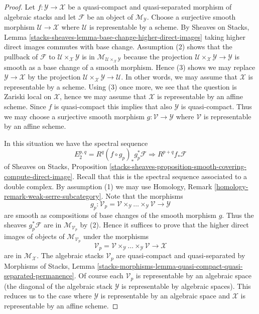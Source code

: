 \begin{proof}
Let $f : \mathcal{Y} \to \mathcal{X}$ be a quasi-compact and quasi-separated
morphism of algebraic stacks and let $\mathcal{F}$ be an object of
$\mathcal{M}_\mathcal{Y}$. Choose a surjective smooth morphism
$\mathcal{U} \to \mathcal{X}$ where $\mathcal{U}$ is representable by
a scheme. By
Sheaves on Stacks, Lemma
\ref{stacks-sheaves-lemma-base-change-higher-direct-images}
taking higher direct images commutes with base change.
Assumption (2) shows that the pullback of $\mathcal{F}$
to $\mathcal{U} \times_\mathcal{X} \mathcal{Y}$ is in
$\mathcal{M}_{\mathcal{U} \times_\mathcal{X} \mathcal{Y}}$
because the projection
$\mathcal{U} \times_\mathcal{X} \mathcal{Y} \to \mathcal{Y}$
is smooth as a base change of a smooth morphism. Hence (3) shows we may
replace $\mathcal{Y} \to \mathcal{X}$ by the projection
$\mathcal{U} \times_\mathcal{X} \mathcal{Y} \to \mathcal{U}$.
In other words, we may assume that $\mathcal{X}$
is representable by a scheme.
Using (3) once more, we see that the question is Zariski local on
$\mathcal{X}$, hence we may assume that $\mathcal{X}$ is representable by
an affine scheme. Since $f$ is quasi-compact this implies that also
$\mathcal{Y}$ is quasi-compact. Thus we may choose a surjective smooth
morphism $g : \mathcal{V} \to \mathcal{Y}$ where $\mathcal{V}$ is representable
by an affine scheme.

\medskip\noindent
In this situation we have the spectral sequence
$$
E_2^{p, q} = R^q(f \circ g_p)_*g_p^*\mathcal{F}
\Rightarrow
R^{p + q}f_*\mathcal{F}
$$
of
Sheaves on Stacks, Proposition
\ref{stacks-sheaves-proposition-smooth-covering-compute-direct-image}.
Recall that this is the spectral sequence associated to a double
complex. By assumption (1) we may use
Homology, Remark \ref{homology-remark-weak-serre-subcategory}.
Note that the morphisms
$$
g_p : \mathcal{V}_p =
\mathcal{V} \times_\mathcal{Y} \ldots \times_\mathcal{Y} \mathcal{V}
\longrightarrow
\mathcal{Y}
$$
are smooth as compositions of base changes of the smooth morphism $g$.
Thus the sheaves $g_p^*\mathcal{F}$ are in
$\mathcal{M}_{\mathcal{V}_p}$ by (2). Hence it suffices to prove that the
higher direct images of objects of $\mathcal{M}_{\mathcal{V}_p}$ under
the morphisms
$$
\mathcal{V}_p =
\mathcal{V} \times_\mathcal{Y} \ldots \times_\mathcal{Y} \mathcal{V}
\longrightarrow
\mathcal{X}
$$
are in $\mathcal{M}_\mathcal{X}$. The algebraic stacks $\mathcal{V}_p$
are quasi-compact and quasi-separated by
Morphisms of Stacks, Lemma
\ref{stacks-morphisms-lemma-quasi-compact-quasi-separated-permanence}.
Of course each $\mathcal{V}_p$ is representable by an algebraic space
(the diagonal of the algebraic stack $\mathcal{Y}$ is representable
by algebraic spaces). This reduces us to the case where
$\mathcal{Y}$ is representable by an algebraic space and $\mathcal{X}$
is representable by an affine scheme.


\end{proof}
